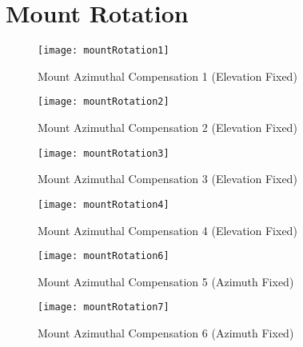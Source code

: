 \section{Mount Rotation}\label{sec:appendix_mount_rotation}
\begin{figure}[!htb]
  \begin{minipage}{.32\textwidth}
    \centering
    \texttt{[image: mountRotation1]}
    \caption{Mount Azimuthal Compensation 1 (Elevation Fixed)}
    \label{fig:mountCompensation1}
  \end{minipage}
  \begin{minipage}{.32\textwidth}
    \centering
    \texttt{[image: mountRotation2]}
    \caption{Mount Azimuthal Compensation 2 (Elevation Fixed)}
    \label{fig:mountCompensation2}
  \end{minipage}
  \begin{minipage}{.32\textwidth}
    \centering
    \texttt{[image: mountRotation3]}
    \caption{Mount Azimuthal Compensation 3 (Elevation Fixed)}
    \label{fig:mountCompensation3}
  \end{minipage}
\end{figure}
\begin{figure}[!htb]
  \begin{minipage}{.32\textwidth}
    \centering
    \texttt{[image: mountRotation4]}
    \caption{Mount Azimuthal Compensation 4 (Elevation Fixed)}
    \label{fig:mountCompensation4}
  \end{minipage}
  \begin{minipage}{.32\textwidth}
    \centering
    \texttt{[image: mountRotation6]}
    \caption{Mount Azimuthal Compensation 5 (Azimuth Fixed)}
    \label{fig:mountCompensation5}
  \end{minipage}
  \begin{minipage}{.32\textwidth}
    \centering
    \texttt{[image: mountRotation7]}
    \caption{Mount Azimuthal Compensation 6 (Azimuth Fixed)}
    \label{fig:mountCompensation6}
  \end{minipage}
\end{figure}
